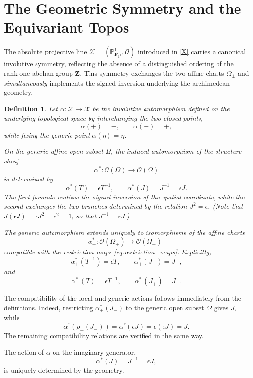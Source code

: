 \documentclass[11pt,a4paper]{article}
\newtheorem{definition}[theorem]{Definition}
\renewcommand{\P}{\mathbb{P}}
\newcommand{\Z}{\mathbf{Z}}
\newcommand{\Ftwo}{\mathbf{F}_{1^2}}
\begin{document}
\section{The Geometric Symmetry and the Equivariant Topos}

The absolute projective line $\mathcal X=(\P^1_{\Ftwo},\mathcal O)$ introduced in \eqref{X} carries a canonical involutive symmetry, reflecting the
absence of a distinguished ordering of the rank-one abelian group $\Z$. This
symmetry exchanges the two affine charts $\Omega_\pm$ and \emph{simultaneously} implements the
signed inversion underlying the archimedean geometry.

\begin{definition}\label{def:alpha_symmetry}
Let
$
\alpha:\mathcal X\longrightarrow \mathcal X
$
be the involutive automorphism defined on the underlying topological space by
interchanging the two closed points,
\[
\alpha(+)= -,\qquad
\alpha(-)= +,
\]
while fixing the generic point
$
\alpha(\eta)=\eta$.

On the generic affine open subset $\Omega$, the induced automorphism of the
structure sheaf
\[
\alpha^*:\mathcal O(\Omega)\longrightarrow\mathcal O(\Omega)
\]
is determined by
\[
\alpha^*(T)=\epsilon T^{-1},
\qquad
\alpha^*(J)=J^{-1}=\epsilon J.
\]
The first formula realizes the signed inversion of the spatial coordinate,
while the second exchanges the two branches determined by the relation
$J^2=\epsilon$. (Note that
$
J(\epsilon J)=\epsilon J^2=\epsilon^2=1$, 
so that
$
J^{-1}=\epsilon J$.)

The generic automorphism extends uniquely to isomorphisms of the affine
charts
\[
\alpha^*_\pm:
\mathcal O(\Omega_\mp)
\longrightarrow
\mathcal O(\Omega_\pm),
\]
compatible with the restriction maps
\eqref{eq:restriction_maps}. Explicitly,
\[
\alpha_+^*(T^{-1})=\epsilon T,
\qquad
\alpha_+^*(J_-)=J_+,
\]
and
\[
\alpha_-^*(T)=\epsilon T^{-1},
\qquad
\alpha_-^*(J_+)=J_-.
\]
\end{definition}


The compatibility of the local and generic actions follows immediately from
the definitions. Indeed, restricting $\alpha_+^*(J_-)$ to the generic open
subset $\Omega$ gives
$
J$, 
while
\[
\alpha^*(\rho_-(J_-))
=
\alpha^*(\epsilon J)
=
\epsilon(\epsilon J)
=
J.
\]
The remaining compatibility relations are verified in the same way.

The action of $\alpha$ on the imaginary generator,
\begin{equation}\label{epsi}
\alpha^*(J)=J^{-1}=\epsilon J,
\end{equation}
is uniquely determined by the geometry. \vspace{.05in}
\end{document}
